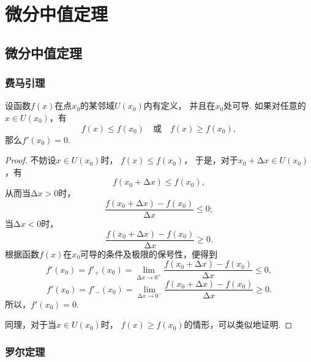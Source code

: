 \chapter{微分中值定理}
\section{微分中值定理}
\subsection{费马引理}
\begin{lemma}[费马引理]\label{theorem:微分中值定理.费马引理}
设函数\(f(x)\)在点\(x_0\)的某邻域\(U(x_0)\)内有定义，
并且在\(x_0\)处可导.
如果对任意的\(x \in U(x_0)\)，有
\[
    f(x) \leq f(x_0)
    \quad\text{或}\quad
    f(x) \geq f(x_0),
\]
那么\(f'(x_0) = 0\).
\begin{proof}
不妨设\(x \in U(x_0)\)时，
\(f(x) \leq f(x_0)\)，
于是，对于\(x_0 + \increment x \in U(x_0)\)，有\[
    f(x_0 + \increment x) \leq f(x_0),
\]
从而当\(\increment x > 0\)时，\[
    \frac{f(x_0 + \increment x) - f(x_0)}{\increment x} \leq 0;
\]
当\(\increment x < 0\)时，\[
    \frac{f(x_0 + \increment x) - f(x_0)}{\increment x} \geq 0.
\]
根据函数\(f(x)\)在\(x_0\)可导的条件及极限的保号性，便得到\[
    f'(x_0) = f'_+(x_0)
    = \lim_{\increment x\to0^+}
    \frac{f(x_0 + \increment x) - f(x_0)}{\increment x} \leq 0,
\]\[
    f'(x_0) = f'_-(x_0)
    = \lim_{\increment x\to0^-}
    \frac{f(x_0 + \increment x) - f(x_0)}{\increment x} \geq 0.
\]
所以，\(f'(x_0) = 0\).

同理，对于当\(x \in U(x_0)\)时，
\(f(x) \geq f(x_0)\)的情形，可以类似地证明.
\end{proof}
\end{lemma}

\subsection{罗尔定理}
\begin{figure}[ht]
	\centering
	\caption{}
	\label{figure:微分中值定理.罗尔定理的几何意义}
\end{figure}

